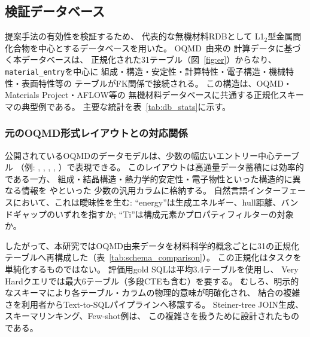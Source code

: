 \documentclass[5p,twocolumn]{elsarticle}
\begin{document}
\subsection{検証データベース}

提案手法の有効性を検証するため、
代表的な無機材料RDBとして
L1$_2$型金属間化合物を中心とするデータベースを用いた。
OQMD~\cite{saal2013oqmd,kirklin2015oqmd}由来の
計算データに基づく本データベースは、
正規化された31テーブル（図~\ref{fig:er}）からなり、
\texttt{material\_entry}を中心に
組成・構造・安定性・計算特性・電子構造・機械特性・表面特性等の
テーブルがFK関係で接続される。
この構造は、OQMD・Materials Project・AFLOW等の
無機材料データベースに共通する正規化スキーマの典型例である。
主要な統計を表~\ref{tab:db_stats}に示す。

\subsubsection{元のOQMD形式レイアウトとの対応関係}

公開されているOQMDのデータモデルは、少数の幅広いエントリー中心テーブル
（例: , , ,
, ）で表現できる。
このレイアウトは高通量データ蓄積には効率的である一方、
組成・結晶構造・熱力学的安定性・電子物性といった構造的に異なる情報を
やといった
少数の汎用カラムに格納する。
自然言語インターフェースにおいて、これは曖昧性を生む:
``energy''は生成エネルギー、hull距離、バンドギャップのいずれを指すか;
``Ti''は構成元素かプロパティフィルターの対象か。

したがって、本研究ではOQMD由来データを材料科学的概念ごとに31の正規化テーブルへ再構成した（表~\ref{tab:schema_comparison}）。
この正規化はタスクを単純化するものではない。
評価用gold SQLは平均3.4テーブルを使用し、
Very Hardクエリでは最大6テーブル（多段CTEも含む）を要する。
むしろ、明示的なスキーマにより各テーブル・カラムの物理的意味が明確化され、
結合の複雑さを利用者からText-to-SQLパイプラインへ移譲する。
Steiner-tree JOIN生成、スキーマリンキング、Few-shot例は、
この複雑さを扱うために設計されたものである。
\end{document}
